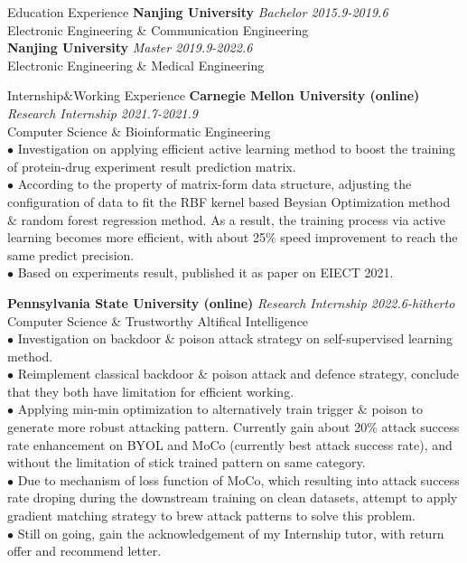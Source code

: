 \documentclass{resume} %
\begin{document}
\begin{rSection}{Education Experience}
    {\bf Nanjing University} \hfill {\em Bachelor 2015.9-2019.6} \\
    Electronic Engineering \& Communication Engineering \\

    {\bf Nanjing University} \hfill {\em Master 2019.9-2022.6} \\
    Electronic Engineering \& Medical Engineering \\

\end{rSection}

\begin{rSection}{Internship$\&$Working Experience}
    {\bf Carnegie Mellon University (online)} \hfill {\em Research Internship 2021.7-2021.9} \\
    Computer Science \& Bioinformatic Engineering \\
    {$\bullet$ Investigation on applying efficient active learning method to boost the training of protein-drug experiment result prediction matrix. \\
    $\bullet$ According to the property of matrix-form data structure, adjusting the configuration of data to fit the RBF kernel based Beysian Optimization method $\&$ random forest regression method. As a result, the training process via active learning becomes more efficient, with about 25$\%$ speed improvement to reach the same predict precision. \\
    $\bullet$ Based on experiments result, published it as paper on EIECT 2021.}

    {\bf Pennsylvania State University (online)} \hfill {\em Research Internship 2022.6-hitherto} \\
    Computer Science \& Trustworthy Altifical Intelligence \\
    {$\bullet$ Investigation on backdoor $\&$ poison attack strategy on self-supervised learning method. \\
    $\bullet$ Reimplement classical backdoor $\&$ poison attack and defence strategy, conclude that they both have limitation for efficient working.\\
    $\bullet$ Applying min-min optimization to alternatively train trigger $\&$ poison to generate more robust attacking pattern. Currently gain about 20\% attack success rate enhancement on BYOL and MoCo (currently best attack success rate), and without the limitation of stick trained pattern on same category.\\
    $\bullet$ Due to mechanism of loss function of MoCo, which resulting into attack success rate droping during the downstream training on clean datasets, attempt to apply gradient matching strategy to brew attack patterns to solve this problem.\\
    $\bullet$ Still on going, gain the acknowledgement of my Internship tutor, with return offer and recommend letter.}


\end{rSection}
\end{document}
